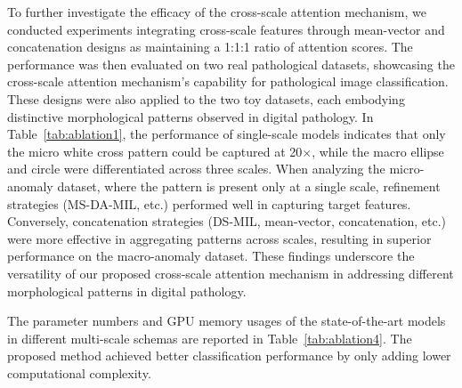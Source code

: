 \documentclass[times,twocolumn,final]{elsarticle}
\begin{document}

To further investigate the efficacy of the cross-scale attention mechanism, we conducted experiments integrating cross-scale features through mean-vector and concatenation designs as maintaining a 1:1:1 ratio of attention scores. The performance was then evaluated on two real pathological datasets, showcasing the cross-scale attention mechanism's capability for pathological image classification. These designs were also applied to the two toy datasets, each embodying distinctive morphological patterns observed in digital pathology. In Table~\ref{tab:ablation1}, the performance of single-scale models indicates that only the micro white cross pattern could be captured at 20$\times$, while the macro ellipse and circle were differentiated across three scales. When analyzing the micro-anomaly dataset, where the pattern is present only at a single scale, refinement strategies (MS-DA-MIL, etc.) performed well in capturing target features. Conversely, concatenation strategies (DS-MIL, mean-vector, concatenation, etc.) were more effective in aggregating patterns across scales, resulting in superior performance on the macro-anomaly dataset. These findings underscore the versatility of our proposed cross-scale attention mechanism in addressing different morphological patterns in digital pathology.

The parameter numbers and GPU memory usages of the state-of-the-art models in different multi-scale schemas are reported in Table~\ref{tab:ablation4}. The proposed method achieved better classification performance by only adding lower computational complexity.
\end{document}
